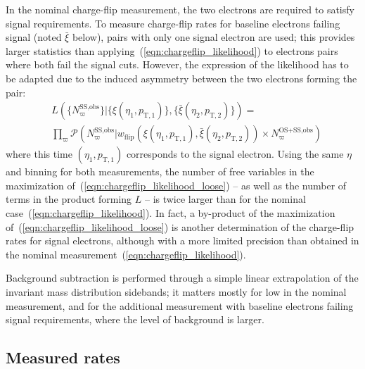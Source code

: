 In the nominal charge-flip measurement, the two electrons are required to satisfy signal requirements. 
To measure charge-flip rates for baseline electrons failing signal (noted $\bar\xi$ below), 
pairs with only one signal electron are used; 
this provides larger statistics than applying~(\ref{eqn:chargeflip_likelihood}) to electrons pairs where both fail the signal cuts. 
However, the expression of the likelihood has to be adapted due to the induced asymmetry between the two electrons forming the pair: 
\begin{equation}
\begin{aligned}
{} & L(\{N^\text{SS,obs}_\varpi\}|\{\xi(\eta_1,p_{\mathrm{T},1})\},\{\bar\xi(\eta_2,p_{\mathrm{T},2})\}) 
= \\
& \prod_{\varpi} \mathcal P\left(N^\text{SS,obs}_\varpi|w_\text{flip}(\xi(\eta_1,p_{\mathrm{T},1}),\bar\xi(\eta_2,p_{\mathrm{T},2}))\times N^\text{OS+SS,obs}_\varpi\right)
\label{eqn:chargeflip_likelihood_loose}
\end{aligned}%
\end{equation}
where this time $(\eta_1,p_{\mathrm{T},1})$ corresponds to the signal electron. 
Using the same $\eta$ and \pt binning for both measurements, 
the number of free variables in the maximization of~(\ref{eqn:chargeflip_likelihood_loose}) 
-- as well as the number of terms in the product forming $L$ -- 
is twice larger than for the nominal case~(\ref{eqn:chargeflip_likelihood}). 
In fact, a by-product of the maximization of~(\ref{eqn:chargeflip_likelihood_loose}) is another determination of the charge-flip rates for signal electrons, 
although with a more limited precision than obtained in the nominal measurement~(\ref{eqn:chargeflip_likelihood}).

Background subtraction is performed through a simple linear extrapolation of the invariant mass distribution sidebands; 
it matters mostly for low \pt in the nominal measurement, 
and for the additional measurement with baseline electrons failing signal requirements, where the level of background is larger. 

\subsection*{Measured rates}
\label{subsec:chargeflip_rates}

